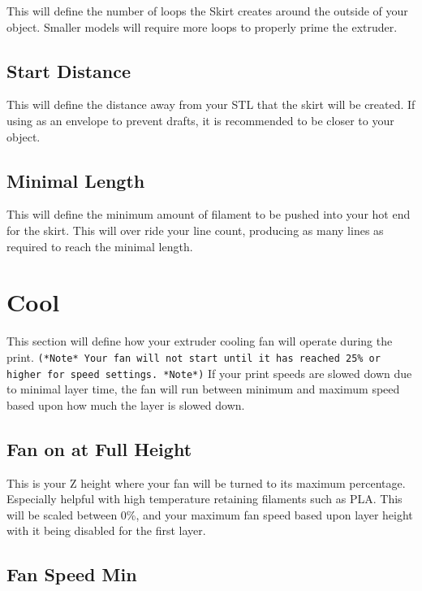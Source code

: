 This will define the number of loops the Skirt creates around the outside of your object. Smaller models will require more loops to properly prime the extruder.

\subsection{Start Distance}

This will define the distance away from your STL that the skirt will be created. If using as an envelope to prevent drafts, it is recommended to be closer to your object.

\subsection{Minimal Length}

This will define the minimum amount of filament to be pushed into your hot end for the skirt. This will over ride your line count, producing as many lines as required to reach the minimal length.

\section{Cool}

This section will define how your extruder cooling fan will operate during the print. \texttt{(*Note* Your fan will not start until it has reached 25\% or higher for speed settings. *Note*)} If your print speeds are slowed down due to minimal layer time, the fan will run between minimum and maximum speed based upon how much the layer is slowed down.

\subsection{Fan on at Full Height}

This is your Z height where your fan will be turned to its maximum percentage. Especially helpful with high temperature retaining filaments such as PLA. This will be scaled between 0\%, and your maximum fan speed based upon layer height with it being disabled for the first layer.

\subsection{Fan Speed Min}

